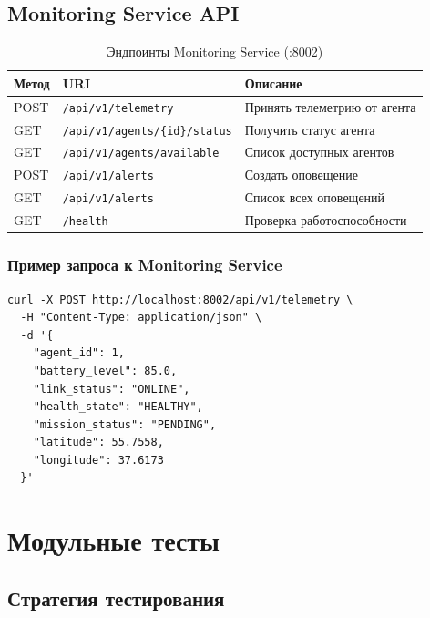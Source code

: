 \documentclass[12pt,a4paper]{article}
\begin{document}
\subsection{Monitoring Service API}

\begin{table}[H]
\centering
\caption{Эндпоинты Monitoring Service (:8002)}
\begin{tabularx}{\textwidth}{|l|l|X|}
\hline
\textbf{Метод} & \textbf{URI} & \textbf{Описание} \\
\hline
POST & \texttt{/api/v1/telemetry}             & Принять телеметрию от агента \\
\hline
GET  & \texttt{/api/v1/agents/\{id\}/status}  & Получить статус агента \\
\hline
GET  & \texttt{/api/v1/agents/available}      & Список доступных агентов \\
\hline
POST & \texttt{/api/v1/alerts}                & Создать оповещение \\
\hline
GET  & \texttt{/api/v1/alerts}                & Список всех оповещений \\
\hline
GET  & \texttt{/health}                       & Проверка работоспособности \\
\hline
\end{tabularx}
\end{table}

\subsubsection{Пример запроса к Monitoring Service}

\begin{lstlisting}[style=bash, caption={Отправка телеметрии (curl)}]
curl -X POST http://localhost:8002/api/v1/telemetry \
  -H "Content-Type: application/json" \
  -d '{
    "agent_id": 1,
    "battery_level": 85.0,
    "link_status": "ONLINE",
    "health_state": "HEALTHY",
    "mission_status": "PENDING",
    "latitude": 55.7558,
    "longitude": 37.6173
  }'
\end{lstlisting}

\section{Модульные тесты}

\subsection{Стратегия тестирования}
\end{document}
